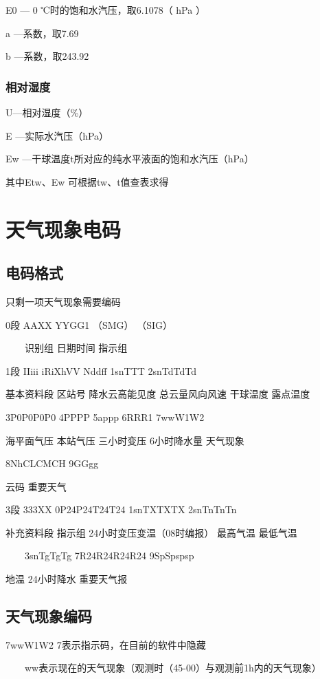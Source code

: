 ﻿\documentclass[UTF8,11pt]{ctexbook}%
\begin{document}
E0 — 0 ℃时的饱和水汽压，取6.1078（ hPa ）

a —系数，取7.69

b —系数，取243.92

\subsection{相对湿度}

U—相对湿度（\%）

E —实际水汽压（hPa）

Ew —干球温度t所对应的纯水平液面的饱和水汽压（hPa）

其中Etw、Ew 可根据tw、t值查表求得

\chapter{天气现象电码}

\section{电码格式}

只剩一项天气现象需要编码

0段		AAXX	YYGG1		（SMG）	（SIG）

　　识别组	日期时间	指示组

1段			IIiii  	iRiXhVV		Nddff		1snTTT		2snTdTdTd 		 

基本资料段	区站号	降水云高能见度	总云量风向风速	干球温度		露点温度		

			3P0P0P0P0	4PPPP		5appp		6RRR1		7wwW1W2

     海平面气压	本站气压		三小时变压    6小时降水量	天气现象

			8NhCLCMCH	9GGgg

			云码   		重要天气

3段			333XX		0P24P24T24T24				1snTXTXTX	2snTnTnTn

补充资料段	指示组		24小时变压变温（08时编报）	最高气温		最低气温

　　3snTgTgTg	7R24R24R24R24	9SpSpspsp

     地温			24小时降水		重要天气报  

\section{天气现象编码}

7wwW1W2	7表示指示码，在目前的软件中隐藏

　　ww表示现在的天气现象（观测时（45-00）与观测前1h内的天气现象）
\end{document}
